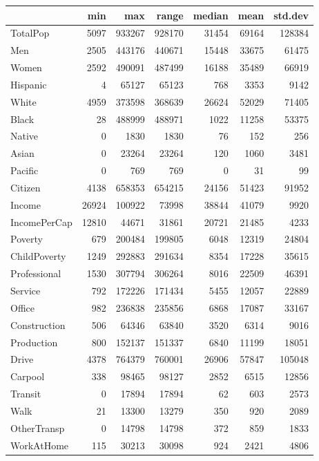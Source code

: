 \documentclass{article}
\begin{document}
\begin{table}
	\centering
	\begin{tabular}{l|rrrrrr}
		& min & max & range & median & mean & std.dev\\\hline
	TotalPop & 5097 & 933267 & 928170 & 31454 & 69164 & 128384\\
	Men & 2505 & 443176 & 440671 & 15448 & 33675 & 61475\\
	Women & 2592 & 490091 & 487499 & 16188 & 35489 & 66919\\
	Hispanic & 4 & 65127 & 65123 & 768 & 3353 & 9142\\
	White & 4959 & 373598 & 368639 & 26624 & 52029 & 71405\\
	Black & 28 & 488999 & 488971 & 1022 & 11258 & 53375\\
	Native & 0 & 1830 & 1830 & 76 & 152 & 256\\
	Asian & 0 & 23264 & 23264 & 120 & 1060 & 3481\\
	Pacific & 0 & 769 & 769 & 0 & 31 & 99\\
	Citizen & 4138 & 658353 & 654215 & 24156 & 51423 & 91952\\
	Income & 26924 & 100922 & 73998 & 38844 & 41079 & 9920\\
	IncomePerCap & 12810 & 44671 & 31861 & 20721 & 21485 & 4233\\
	Poverty & 679 & 200484 & 199805 & 6048 & 12319 & 24804\\
	ChildPoverty & 1249 & 292883 & 291634 & 8354 & 17228 & 35615\\
	Professional & 1530 & 307794 & 306264 & 8016 & 22509 & 46391\\
	Service & 792 & 172226 & 171434 & 5455 & 12057 & 22889\\
	Office & 982 & 236838 & 235856 & 6868 & 17087 & 33167\\
	Construction & 506 & 64346 & 63840 & 3520 & 6314 & 9016\\
	Production & 800 & 152137 & 151337 & 6840 & 11199 & 18051\\
	Drive & 4378 & 764379 & 760001 & 26906 & 57847 & 105048\\
	Carpool & 338 & 98465 & 98127 & 2852 & 6515 & 12856\\
	Transit & 0 & 17894 & 17894 & 62 & 603 & 2573\\
	Walk & 21 & 13300 & 13279 & 350 & 920 & 2089\\
	OtherTransp & 0 & 14798 & 14798 & 372 & 859 & 1833\\
	WorkAtHome & 115 & 30213 & 30098 & 924 & 2421 & 4806\\

\end{tabular}
\end{table}
\end{document}
